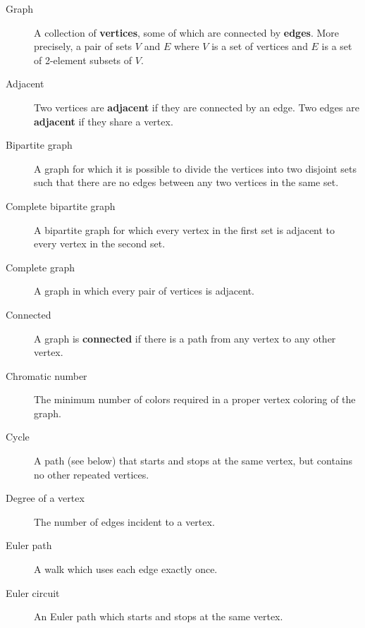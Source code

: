 \documentclass[10pt,]{book}
\newcommand{\terminology}[1]{\textbf{#1}}
\theoremstyle{plain}
\theoremstyle{definition}
\theoremstyle{definition}
\theoremstyle{definition}
\theoremstyle{definition}
\numberwithin{equation}{chapter}
\begin{document}
\begin{assemblage}\label{assemblage-39}
\hypertarget{p-1534}{}%
%
\begin{description}
\item[{Graph}]\hypertarget{li-689}{}\hypertarget{p-1535}{}%
 A collection of \terminology{vertices}, some of which are connected by \terminology{edges}. More precisely, a pair of sets \(V\) and \(E\) where \(V\) is a set of vertices and \(E\) is a set of 2-element subsets of \(V\).%
\item[{Adjacent}]\hypertarget{li-690}{}\hypertarget{p-1536}{}%
 Two vertices are \terminology{adjacent} if they are connected by an edge. Two edges are \terminology{adjacent} if they share a vertex.%
\item[{Bipartite graph}]\hypertarget{li-691}{}\hypertarget{p-1537}{}%
 A graph for which it is possible to divide the vertices into two disjoint sets such that there are no edges between any two vertices in the same set.%
\item[{Complete bipartite graph}]\hypertarget{li-692}{}\hypertarget{p-1538}{}%
A bipartite graph for which every vertex in the first set is adjacent to every vertex in the second set.%
\item[{Complete graph}]\hypertarget{li-693}{}\hypertarget{p-1539}{}%
 A graph in which every pair of vertices is adjacent.%
\item[{Connected}]\hypertarget{li-694}{}\hypertarget{p-1540}{}%
 A graph is \terminology{connected} if there is a path from any vertex to any other vertex.%
\item[{Chromatic number}]\hypertarget{li-695}{}\hypertarget{p-1541}{}%
 The minimum number of colors required in a proper vertex coloring of the graph.%
\item[{Cycle}]\hypertarget{li-696}{}\hypertarget{p-1542}{}%
 A path (see below) that starts and stops at the same vertex, but contains no other repeated vertices.%
\item[{Degree of a vertex}]\hypertarget{li-697}{}\hypertarget{p-1543}{}%
 The number of edges incident to a vertex.%
\item[{Euler path}]\hypertarget{li-698}{}\hypertarget{p-1544}{}%
A walk which uses each edge exactly once.%
\item[{Euler circuit}]\hypertarget{li-699}{}\hypertarget{p-1545}{}%
 An Euler path which starts and stops at the same vertex.%

\end{description}
\end{assemblage}
\end{document}
